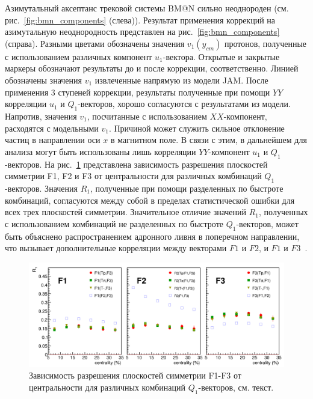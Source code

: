 Азимутальный аксептанс трековой системы BM@N сильно неоднороден (см. рис.~\ref{fig:bmn_components} (слева)).
Результат  применения коррекций на азимутальную неоднородность представлен на рис.~\ref{fig:bmn_components} (справа).
Разными цветами обозначены значения $v_1(y_{cm})$ протонов, полученные с использованием различных компонент $u_1$-вектора. 
Открытые и закрытые маркеры обозначают результаты до и после коррекции, соответственно.
Линией обозначены значения $v_1$  извлеченные напрямую из модели JAM.
После применения 3 ступеней коррекции, результаты полученные при помощи $YY$ корреляции $u_1$ и $Q_1$-векторов, хорошо согласуются с результатами из модели.
Напротив, значения $v_1$, посчитанные с использованием $XX$-компонент, расходятся с модельными  $v_1$. 
Причиной может служить сильное отклонение частиц в направлении оси $x$ в магнитном поле. 
В связи с этим, в дальнейшем для анализа могут быть использованы лишь корреляции $YY$-компонент $u_1$ и $Q_1$-векторов.
На рис.~\ref{fig:bmn_combinations} представлена зависимость разрешения плоскостей симметрии F1, F2 и F3 от центральности для различных комбинаций $Q_1$-векторов.
Значения $R_1$, полученные при помощи разделенных по быстроте комбинаций, согласуются между собой в пределах статистической ошибки для всех трех плоскостей симметрии. 
Значительное отличие значений $R_1$, полученных с использованием комбинаций не разделенных по быстроте $Q_1$-векторов, может быть объяснено распространением адронного ливня в поперечном направлении, что вызывает дополнительные корреляции между векторами $F1$ и $F2$, и $F1$ и $F3$~\cite{Mamaev:2023fpr}.
%
\begin{figure}[h]
\begin{center}
\includegraphics[width=0.87\linewidth]{images/R1_F123_combinations_centrality.png}
\caption{Зависимость разрешения плоскостей симметрии F1-F3 от центральности для различных комбинаций $Q_1$-векторов, см. текст.}
\label{fig:bmn_combinations}
\end{center}
\end{figure}

